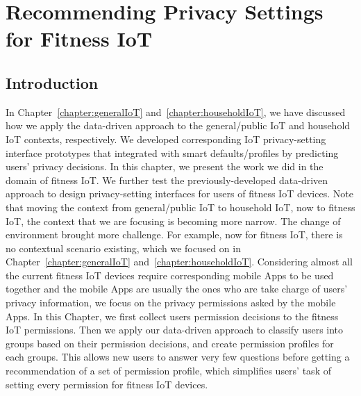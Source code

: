 \chapter{Recommending Privacy Settings for Fitness IoT}\label{chapter:fitnessIoT}

\section{Introduction}\label{fitnessIntro}
In Chapter~\ref{chapter:generalIoT} and~\ref{chapter:householdIoT}, we have discussed how we apply the data-driven approach to the general/public IoT and household IoT contexts, respectively. We developed corresponding IoT privacy-setting interface prototypes that integrated with smart defaults/profiles by predicting users' privacy decisions. In this chapter, we present the work we did in the domain of fitness IoT. We further test the previously-developed data-driven approach to design privacy-setting interfaces for users of fitness IoT devices. Note that moving the context from general/public IoT to household IoT, now to fitness IoT, the context that we are focusing is becoming more narrow. The change of environment brought more challenge. For example, now for fitness IoT, there is no contextual scenario existing, which we focused on in Chapter~\ref{chapter:generalIoT} and~\ref{chapter:householdIoT}. Considering almost all the current fitness IoT devices require corresponding mobile Apps to be used together and the mobile Apps are usually the ones who are take charge of users' privacy information, we focus on the privacy permissions asked by the mobile Apps. In this Chapter, we first collect users permission decisions to the fitness IoT permissions. Then we apply our data-driven approach to classify users into groups based on their permission decisions, and create permission profiles for each groups. This allows new users to answer very few questions before getting a recommendation of a set of permission profile, which simplifies users' task of setting every permission for fitness IoT devices.


